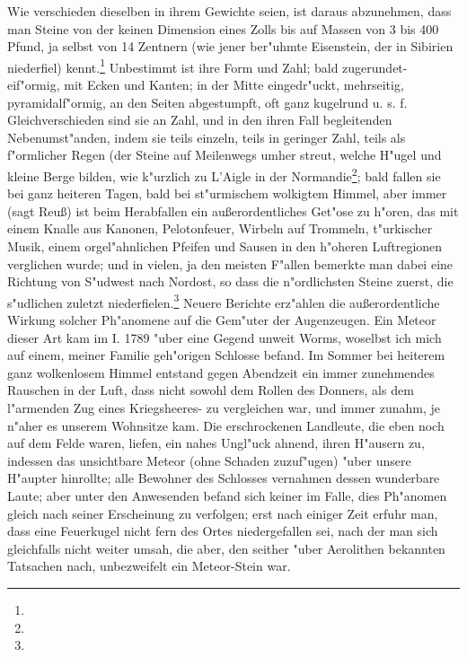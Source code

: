 \documentclass[a4paper, 11pt, oneside, polutonikogreek, german]{article}
\begin{document}
Wie verschieden dieselben in ihrem Gewichte seien, ist daraus abzunehmen, dass man Steine von der keinen Dimension eines Zolls bis auf Massen von 3 bis 400 Pfund, ja selbst von 14 Zentnern (wie jener ber"uhmte Eisenstein, der in Sibirien niederfiel) kennt.\footnote{} Unbestimmt ist ihre Form und Zahl; bald zugerundet-eif"ormig, mit Ecken und Kanten; in der Mitte eingedr"uckt, mehrseitig, pyramidalf"ormig, an den Seiten abgestumpft, oft ganz kugelrund u. s. f. Gleichverschieden sind sie an Zahl, und in den ihren Fall begleitenden Nebenumst"anden, indem sie teils einzeln, teils in geringer Zahl, teils als f"ormlicher Regen (der Steine auf Meilenwegs umher streut, welche H"ugel und kleine Berge bilden, wie k"urzlich zu L’Aigle in der Normandie\footnote{}; bald fallen sie bei ganz heiteren Tagen, bald bei st"urmischem wolkigtem Himmel, aber immer (sagt Reuß) ist beim Herabfallen ein außerordentliches Get"ose zu h"oren, das mit einem Knalle aus Kanonen, Pelotonfeuer, Wirbeln auf Trommeln, t"urkischer Musik, einem orgel"ahnlichen Pfeifen und Sausen in den h"oheren Luftregionen verglichen wurde; und in vielen, ja den meisten F"allen bemerkte man dabei eine Richtung von S"udwest nach Nordost, so dass die n"ordlichsten Steine zuerst, die s"udlichen zuletzt niederfielen.\footnote{} Neuere Berichte erz"ahlen die außerordentliche Wirkung solcher Ph"anomene auf die Gem"uter der Augenzeugen. Ein Meteor dieser Art kam im I. 1789 "uber eine Gegend unweit Worms, woselbst ich mich auf einem, meiner Familie geh"origen Schlosse befand. Im Sommer bei heiterem ganz wolkenlosem Himmel entstand gegen Abendzeit ein immer zunehmendes Rauschen in der Luft, dass nicht sowohl dem Rollen des Donners, als dem l"armenden Zug eines Kriegsheeres- zu vergleichen war, und immer zunahm, je n"aher es unserem Wohnsitze kam. Die erschrockenen Landleute, die eben noch auf dem Felde waren, liefen, ein nahes Ungl"uck ahnend, ihren H"ausern zu, indessen das unsichtbare Meteor (ohne Schaden zuzuf"ugen) "uber unsere H"aupter hinrollte; alle Bewohner des Schlosses vernahmen dessen wunderbare Laute; aber unter den Anwesenden befand sich keiner im Falle, dies Ph"anomen gleich nach seiner Erscheinung zu verfolgen; erst nach einiger Zeit erfuhr man, dass eine Feuerkugel nicht fern des Ortes niedergefallen sei, nach der man sich gleichfalls nicht weiter umsah, die aber, den seither "uber Aerolithen bekannten Tatsachen nach, unbezweifelt ein Meteor-Stein war.
\end{document}
